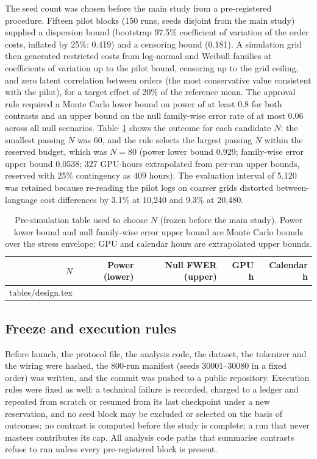 \documentclass[preprint,12pt,authoryear]{elsarticle}
\makeatletter
\newcommand{\tablebody}[1]{\@@input #1 }  %
\makeatother
\begin{document}
The seed count was chosen before the main study from a pre-registered procedure. Fifteen pilot blocks (150 runs, seeds disjoint from the main study) supplied a dispersion bound (bootstrap 97.5\% coefficient of variation of the order costs, inflated by 25\%: 0.419) and a censoring bound (0.181). A simulation grid then generated restricted costs from log-normal and Weibull families at coefficients of variation up to the pilot bound, censoring up to the grid ceiling, and zero latent correlation between orders (the most conservative value consistent with the pilot), for a target effect of 20\% of the reference mean. The approval rule required a Monte Carlo lower bound on power of at least 0.8 for both contrasts and an upper bound on the null family-wise error rate of at most 0.06 across all null scenarios. Table~\ref{tab:design} shows the outcome for each candidate $N$: the smallest passing $N$ was 60, and the rule selects the largest passing $N$ within the reserved budget, which was $N{=}80$ (power lower bound 0.929; family-wise error upper bound 0.0538; 327 GPU-hours extrapolated from per-run upper bounds, reserved with 25\% contingency as 409 hours). The evaluation interval of 5{,}120 was retained because re-reading the pilot logs on coarser grids distorted between-language cost differences by 3.1\% at 10{,}240 and 9.3\% at 20{,}480.

\begin{table}[t]
\caption{Pre-simulation table used to choose $N$ (frozen before the main study). Power lower bound and null family-wise error upper bound are Monte Carlo bounds over the stress envelope; GPU and calendar hours are extrapolated upper bounds.}
\label{tab:design}
\centering
\small
\begin{tabular}{rrrrr}
\toprule
$N$ & Power (lower) & Null FWER (upper) & GPU h & Calendar h \\
\midrule
\tablebody{tables/design.tex}
\bottomrule
\end{tabular}
\end{table}

\subsection{Freeze and execution rules}

Before launch, the protocol file, the analysis code, the dataset, the tokenizer and the wiring were hashed, the 800-run manifest (seeds 30001--30080 in a fixed order) was written, and the commit was pushed to a public repository. Execution rules were fixed as well: a technical failure is recorded, charged to a ledger and repeated from scratch or resumed from its last checkpoint under a new reservation, and no seed block may be excluded or selected on the basis of outcomes; no contrast is computed before the study is complete; a run that never masters contributes its cap. All analysis code paths that summarise contrasts refuse to run unless every pre-registered block is present.
\end{document}
